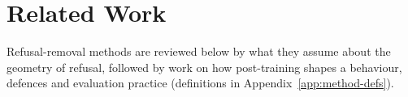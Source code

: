 \section{Related Work}
\label{sec:related}

Refusal-removal methods are reviewed below by what they assume about the
geometry of refusal, followed by work on how post-training shapes a behaviour,
defences and evaluation practice (definitions
in Appendix~\ref{app:method-defs}).

